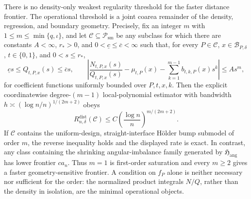There is no density-only weakest regularity threshold for the faster distance frontier.  The operational threshold is a joint coarea remainder of the density, regression, and boundary geometry.  Precisely, fix an integer \(m\) with \(1\leq m\leq\min\{q,\iota\}\), and let \(\mathcal C\subseteq\mathcal P_{\mathrm{sm}}\) be any subclass for which there are constants \(A<\infty\), \(r_*>0\), and \(0<\underline c\leq\overline c<\infty\) such that, for every \(P\in\mathcal C\), \(x\in\mathcal B_{P,\delta}\), \(t\in\{0,1\}\), and \(0<s\leq r_*\),
\[
 \underline c s\leq Q_{t,P,x}(s)\leq\overline c s,
 \qquad
 \left|\frac{N_{t,P,x}(s)}{Q_{t,P,x}(s)}-\mu_{t,P}(x)-\sum_{k=1}^{m-1}b_{t,k,P}(x)s^k\right|\leq As^m,
\]
for coefficient functions uniformly bounded over \(P,t,x,k\).  Then the explicit coordinatewise degree-\((m-1)\) local-polynomial estimator with bandwidth \(h\asymp(\log n/n)^{1/(2m+2)}\) obeys
\[
 R_{n,\delta}^{\mathrm{dist}}(\mathcal C)\leq C\left(\frac{\log n}{n}\right)^{m/(2m+2)}.
\]
If \(\mathcal C\) contains the uniform-design, straight-interface H\"older bump submodel of order \(m\), the reverse inequality holds and the displayed rate is exact.  In contrast, any class containing the shrinking angular-imbalance family generated by \(\mathfrak H_{\mathrm{ang}}\) has lower frontier \(ca_n\).  Thus \(m=1\) is first-order saturation and every \(m\geq2\) gives a faster geometry-sensitive frontier.  A condition on \(f_P\) alone is neither necessary nor sufficient for the order: the normalized product integrals \(N/Q\), rather than the density in isolation, are the minimal operational objects.